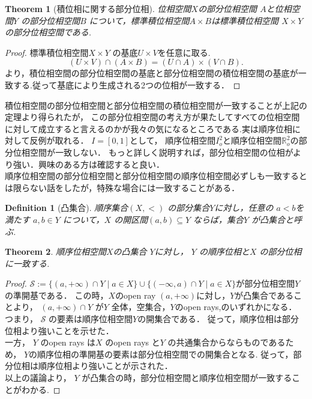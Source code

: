 \documentclass[dvipdfmx]{jbook}
\newtheorem{theorem}{Theorem}[section]
\newtheorem{definition}{Definition}[section]
\theoremstyle{remark}
\theoremstyle{plain}
\begin{document}
\begin{theorem}[積位相に関する部分位相]
	位相空間$X$の部分位相空間 $A$と位相空間$Y$ の部分位相空間$B$ について，標準積位相空間$A\times B$は標準積位相空間 $X \times Y$の部分位相空間である.
\end{theorem}

\begin{proof}
	標準積位相空間$X \times Y$ の基底$U\times V$を任意に取る.
	 \[
		 \left(U \times V\right) \cap \left( A \times B \right) = \left( U \cap A  \right) \times \left( V \cap B \right) 
	.\]
	より，積位相空間の部分位相空間の基底と部分位相空間の積位相空間の基底が一致する.従って基底により生成される2つの位相が一致する．
\end{proof}

積位相空間の部分位相空間と部分位相空間の積位相空間が一致することが上記の定理より得られたが，
この部分位相空間の考え方が果たしてすべての位相空間に対して成立すると言えるのかが我々の気になるところである.実は順序位相に対して反例が取れる．
$I=[0,1]$として， 順序位相空間$I^2_o$と順序位相空間$\mathbb{R}^2_o$の部分位相空間が一致しない．
もっと詳しく説明すれば，部分位相空間の位相がより強い．興味のある方は確認すると良い．\\

順序位相空間の部分位相空間と部分位相空間の順序位相空間必ずしも一致するとは限らない話をしたが，特殊な場合には一致することがある．\\

\begin{definition}[凸集合]
	順序集合$\left( X,< \right) $ の部分集合$Y$に対し，任意の $a<b$を満たす $a,b \in Y$ について，$X$ の開区間$\left( a,b \right) \subseteq Y$ ならば，集合$Y$ が凸集合と呼ぶ.
\end{definition}

\begin{theorem}
	順序位相空間$X$の凸集合 $Y$に対し， $Y$ の順序位相と$X$ の部分位相に一致する.
\end{theorem}

\begin{proof}
	$\mathcal{S}:=\{ \left( a, +\infty \right) \cap Y  \mid a \in X \} \cup \{\left( - \infty ,a\right) \cap Y  \mid  a \in X \}$が部分位相空間$Y$の準開基である．
	この時，$X$のopen ray  $(a,+ \infty)$に対し，$Y$が凸集合であることより，
	$\left( a, +\infty \right) \cap Y$ が$Y$ 全体，空集合，$Y$のopen rays,のいずれかになる．
	つまり， $\mathcal{S}$ の要素は順序位相空間$Y$の開集合である．
	従って，順序位相は部分位相より強いことを示せた．\\
	一方， $Y$ のopen rays は$X$ のopen rays と$Y$ の共通集合からならものであるため，
	$Y$の順序位相の準開基の要素は部分位相空間での開集合となる. 
	従って，部分位相は順序位相より強いことが示された．\\
	以上の議論より， $Y$ が凸集合の時，部分位相空間と順序位相空間が一致することがわかる.
\end{proof}
\end{document}

